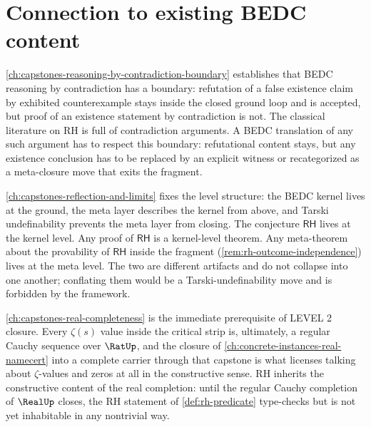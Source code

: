 \section{Connection to existing BEDC content}
\label{sec:rh-connections}

\begin{remark}
\label{rem:rh-reasoning-by-contradiction}
\autoref{ch:capstones-reasoning-by-contradiction-boundary} establishes that BEDC reasoning by contradiction has a boundary: refutation of a false existence claim by exhibited counterexample stays inside the closed ground loop and is accepted, but proof of an existence statement by contradiction is not. The classical literature on RH is full of contradiction arguments. A BEDC translation of any such argument has to respect this boundary: refutational content stays, but any existence conclusion has to be replaced by an explicit witness or recategorized as a meta-closure move that exits the fragment.
\end{remark}

\begin{remark}
\label{rem:rh-reflection}
\autoref{ch:capstones-reflection-and-limits} fixes the level structure: the BEDC kernel lives at the ground, the meta layer describes the kernel from above, and Tarski undefinability prevents the meta layer from closing. The conjecture $\mathsf{RH}$ lives at the kernel level. Any proof of $\mathsf{RH}$ is a kernel-level theorem. Any meta-theorem about the provability of $\mathsf{RH}$ inside the fragment (\autoref{rem:rh-outcome-independence}) lives at the meta level. The two are different artifacts and do not collapse into one another; conflating them would be a Tarski-undefinability move and is forbidden by the framework.
\end{remark}

\begin{remark}
\label{rem:rh-real-completeness}
\autoref{ch:capstones-real-completeness} is the immediate prerequisite of LEVEL 2 closure. Every $\zeta(s)$ value inside the critical strip is, ultimately, a regular Cauchy sequence over $\RatUp$, and the closure of \autoref{ch:concrete-instances-real-namecert} into a complete carrier through that capstone is what licenses talking about $\zeta$-values and zeros at all in the constructive sense. RH inherits the constructive content of the real completion: until the regular Cauchy completion of $\RealUp$ closes, the RH statement of \autoref{def:rh-predicate} type-checks but is not yet inhabitable in any nontrivial way.
\end{remark}

